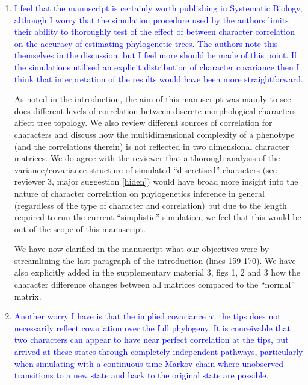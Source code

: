 \documentclass[12pt,letterpaper]{article}
\begin{document}
\begin{enumerate}

\item{\textcolor{blue}{I feel that the manuscript is certainly worth publishing in Systematic Biology, although I worry that the simulation procedure used by the authors limits their ability to thoroughly test of the effect of between character correlation on the accuracy of estimating phylogenetic trees. The authors note this themselves in the discussion, but I feel more should be made of this point. If the simulations utilised an explicit distribution of character covariance then I think that interpretation of the results would have been more straightforward.}}
\label{stramlined}

As noted in the introduction, the aim of this manuscript was mainly to see does different levels of correlation between discrete morphological characters affect tree topology.
We also review different sources of correlation for characters and discuss how the multidimensional complexity of a phenotype (and the correlations therein) is not reflected in two dimensional character matrices.
We do agree with the reviewer that a thorough analysis of the variance/covariance structure of simulated ``discretised'' characters (see reviewer 3, major suggestion \ref{hiden}) would have broad more insight into the nature of character correlation on phylogenetics inference in general (regardless of the type of character and correlation) but due to the length required to run the current ``simplistic'' simulation, we feel that this would be out of the scope of this manuscript.

We have now clarified in the manuscript what our objectives were by streamlining the last paragraph of the introduction (lines 159-170).
We have also explicitly added in the supplementary material 3, figs 1, 2 and 3 how the character difference changes between all matrices compared to the ``normal'' matrix.

\item{\textcolor{blue}{Another worry I have is that the implied covariance at the tips does not necessarily reflect covariation over the full phylogeny. It is conceivable that two characters can appear to have near perfect correlation at the tips, but arrived at these states through completely independent pathways, particularly when simulating with a continuous time Markov chain where unobserved transitions to a new state and back to the original state are possible.}}
\label{hiden}


\end{enumerate}
\end{document}
